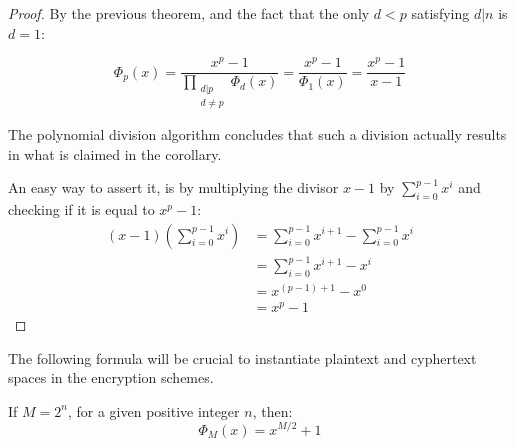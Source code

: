 \begin{proof}
By the previous theorem, and the fact that the only $d<p$ satisfying $d|n$ is $d=1$:

$$\Phi_p(x)=\dfrac{x^p-1}{\displaystyle\prod_{\substack{d|p\\d\neq p}}\Phi_d(x)}=\dfrac{x^p-1}{\Phi_1(x)}=\dfrac{x^p-1}{x-1}$$

The polynomial division algorithm concludes that such a division actually results in what is claimed in the corollary.

An easy way to assert it, is by multiplying the divisor $x-1$ by $\displaystyle\sum_{i=0}^{p-1}x^i$ and checking if it is equal to $x^p-1$:
\begin{align*}
    (x-1)\left(\sum_{i=0}^{p-1}x^i\right)&=\sum_{i=0}^{p-1}x^{i+1}-\sum_{i=0}^{p-1}x^i\\
    &=\sum_{i=0}^{p-1}x^{i+1}-x^{i}\\
    &=x^{(p-1)+1}-x^{0}\\
    &=x^{p}-1
\end{align*}
\end{proof}
The following formula will be crucial to instantiate plaintext and cyphertext spaces in the encryption schemes.
\begin{corollary}
If $M=2^n$, for a given positive integer $n$, then:
$$\Phi_M(x)=x^{M/2}+1$$
\end{corollary}
